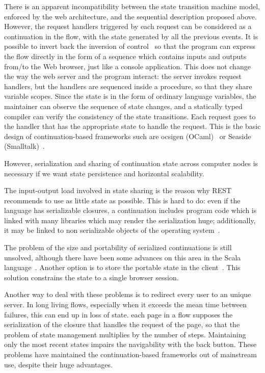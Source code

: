 \documentclass{tmr}
\begin{document}
 
There is an apparent incompatibility between the state transition machine model, enforced by the web architecture, and the sequential description proposed above. However, the request handlers triggered by each request can be considered as a continuation in the flow, with the state generated by all the previous events. It is possible to invert back the inversion of control~\cite{invertingback} so that the program can express the flow directly in the form of a sequence which contains inputs and outputs from/to the Web browser, just like a console application. This does not change the way the web server and the program interact: the server invokes request handlers, but  the handlers are sequenced inside a procedure, so that they share variable scopes. Since the state is in the form of ordinary language variables, the maintainer can observe the sequence of state changes, and a statically typed compiler can verify the consistency of the state transitions. Each request goes to the handler that has the appropriate state to handle the request. This is the basic design of continuation-based frameworks such are ocsigen (OCaml)~\cite{auth:ocsigen} or Seaside (Smalltalk)~\cite{auth:seaside}. 
 
However, serialization  and sharing of continuation state across computer nodes is necessary if we want state persistence and horizontal scalability. 

The input-output load involved in state sharing is the reason why REST recommends to use as little state as possible. This is hard to do: even if the language has serializable closures, a continuation includes program code which is linked with many libraries which may render the serialization huge; additionally, it may be linked to non serializable objects of the operating system~\cite{oleg}. 

The problem of the size and portability of serialized continuations is still unsolved, although there have been some advances on this area in the Scala language~\cite{swarm}. Another option is to store the portable state in the client~\cite{McCarthy:2009:ARW:1631687.1596594}. This solution constrains the state to a single browser session. 
 
Another way to deal with these problems is to redirect every user to an unique server. In long living flows, especially when it exceeds the mean time between failures, this can end up in loss of state. each page in a flow supposes the serialization of the closure that handles the request of the page, so that the problem of state management multiplies by the number of steps. Maintaining only the most recent states impairs the navigability with the back button. These problems have maintained the continuation-based frameworks out of  mainstream use, despite their huge advantages. 
 
\end{document}
